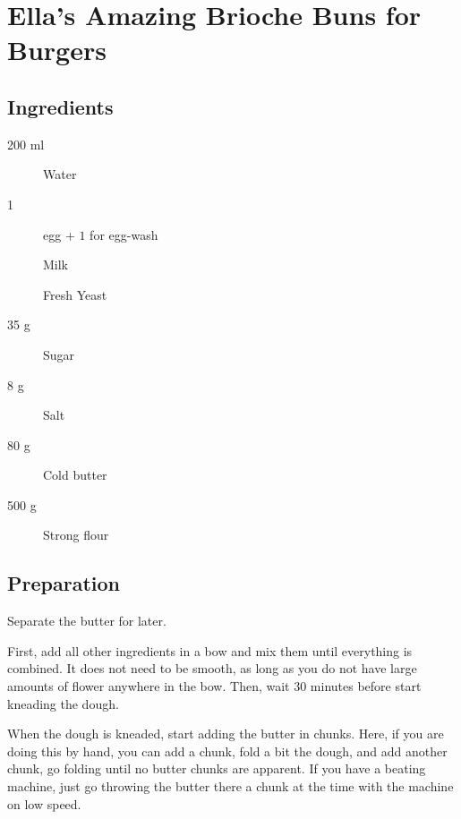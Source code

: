 \setchapterpreamble[u]{\margintoc}
\chapter{Ella's Amazing Brioche Buns for Burgers}

\section{Ingredients}

\begin{multicols}{2}
\begin{description}
	\item[200 ml] Water
	\item[1] egg + $1$ for egg-wash
	\item[] Milk
	\item[] Fresh Yeast
	\item[35 g] Sugar
	\item[8 g] Salt
	\item[80 g] Cold butter
	\item[500 g] Strong flour
\end{description}
\end{multicols}	

\section{Preparation}
Separate the butter for later.

First, add all other ingredients in a bow and mix them until everything is combined. It does not need to be smooth, as long as you do not have large amounts of flower anywhere in the bow.
%
Then, wait $30$ minutes before start kneading the dough.

When the dough is kneaded, start adding the butter in chunks.
%
Here, if you are doing this by hand, you can add a chunk, fold a bit the dough, and add another chunk, go folding until no butter chunks are apparent. 
%
If you have a beating machine, just go throwing the butter there a chunk at the time with the machine on low speed.

